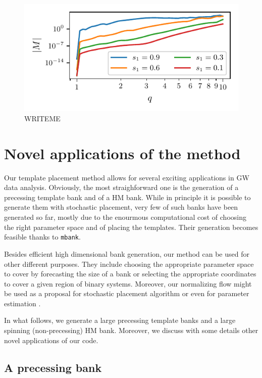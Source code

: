\documentclass[twocolumn,showpacs,preprintnumbers,nofootinbib,prd,
superscriptaddress,10pt]{revtex4-2}
\begin{document}
\begin{figure}[t]
	\centering
	\includegraphics[scale = 1.]{metric_det_vs_q}
	\caption{WRITEME}
	\label{fig:metric_vs_q}
\end{figure}



\section{Novel applications of the method} \label{sec:novel_applications}

Our template placement method allows for several exciting applications in GW data analysis.
Obviously, the most straighforward one is the generation of a precessing template bank and of a HM bank. While in principle it is possible to generate them with stochastic placement, very few of such banks have been generated so far, mostly due to the enourmous computational cost of choosing the right parameter space and of placing the templates. Their generation becomes feasible thanks to \texttt{mbank}.

Besides efficient high dimensional bank generation, our method can be used for other different purposes. They include choosing the appropriate parameter space to cover by forecasting the size of a bank or selecting the appropriate coordinates to cover a given region of binary systems. Moreover, our normalizing flow might be used as a proposal for stochastic placement algorithm or even for parameter estimation \cite{Veitch:2014wba}.

In what follows, we generate a large precessing template banks and a large spinning (non-precessing) HM bank. Moreover, we discuss with some details other novel applications of our code.

\subsection{A precessing bank} \label{sec:precessing_bank}
\end{document}
